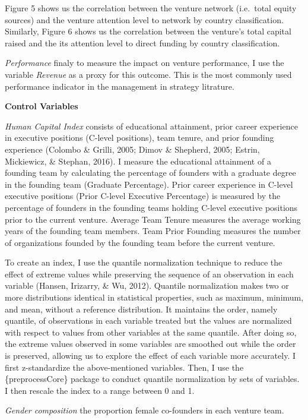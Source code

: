 \documentclass[
  english,
  man]{apa6}
\begin{document}
Figure 5 shows us the correlation between the venture network (i.e.~total equity sources) and the venture attention level to network by country classification. Similarly, Figure 6 shows us the correlation between the venture's total capital raised and the its attention level to direct funding by country classification.

\emph{Performance} finaly to measure the impact on venture performance, I use the variable \emph{Revenue} as a proxy for this outcome. This is the most commonly used performance indicator in the management in strategy litrature.

\textbf{Control Variables}

\emph{Human Capital Index} consists of educational attainment, prior career experience in executive positions (C-level positions), team tenure, and prior founding experience (Colombo \& Grilli, 2005; Dimov \& Shepherd, 2005; Estrin, Mickiewicz, \& Stephan, 2016). I measure the educational attainment of a founding team by calculating the percentage of founders with a graduate degree in the founding team (Graduate Percentage). Prior career experience in C-level executive positions (Prior C-level Executive Percentage) is measured by the percentage of founders in the founding teams holding C-level executive positions prior to the current venture. Average Team Tenure measures the average working years of the founding team members. Team Prior Founding measures the number of organizations founded by the founding team before the current venture.

To create an index, I use the quantile normalization technique to reduce the effect of extreme values while preserving the sequence of an observation in each variable (Hansen, Irizarry, \& Wu, 2012). Quantile normalization makes two or more distributions identical in statistical properties, such as maximum, minimum, and mean, without a reference distribution. It maintains the order, namely quantile, of observations in each variable treated but the values are normalized with respect to values from other variables at the same quantile. After doing so, the extreme values observed in some variables are smoothed out while the order is preserved, allowing us to explore the effect of each variable more accurately. I first z-standardize the above-mentioned variables. Then, I use the \{preprocessCore\} package to conduct quantile normalization by sets of variables. I then rescale the index to a range between 0 and 1.

\emph{Gender composition} the proportion female co-founders in each venture team.
\end{document}
